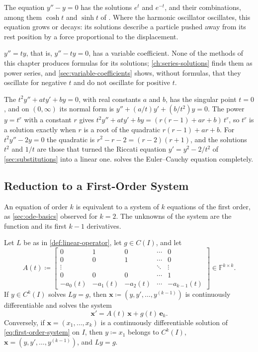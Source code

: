The equation $y''-y=0$ has the solutions $e^t$ and $e^{-t}$, and their combinations, among them $\cosh t$ and $\sinh t$ of . Where the harmonic oscillator oscillates, this equation grows or decays: its solutions describe a particle pushed away from its rest position by a force proportional to the displacement.

 $y''=ty$, that is, $y''-ty=0$, has a variable coefficient. None of the methods of this chapter produces formulas for its solutions; \cref{ch:series-solutions} finds them as power series, and \cref{sec:variable-coefficients} shows, without formulas, that they oscillate for negative $t$ and do not oscillate for positive $t$.

The  $t^2y''+aty'+by=0$, with real constants $a$ and $b$, has the singular point $t=0$, and on $(0,\infty)$ its normal form is $y''+(a/t)y'+(b/t^2)y=0$. The power $y=t^r$ with a constant $r$ gives $t^2y''+aty'+by=(r(r-1)+ar+b)\,t^r$, so $t^r$ is a solution exactly when $r$ is a root of the quadratic $r(r-1)+ar+b$. For $t^2y''-2y=0$ the quadratic is $r^2-r-2=(r-2)(r+1)$, and the solutions $t^2$ and $1/t$ are those that turned the Riccati equation $y'=y^2-2/t^2$ of \cref{sec:substitutions} into a linear one.  solves the Euler--Cauchy equation completely.

\subsection{Reduction to a First-Order System}

An equation of order $k$ is equivalent to a system of $k$ equations of the first order, as \cref{sec:ode-basics} observed for $k=2$. The unknowns of the system are the function and its first $k-1$ derivatives.

\begin{proposition}
\label{prop:companion-system}
Let $L$ be as in \cref{def:linear-operator}, let $g\in C(I)$, and let
\begin{equation}
A(t)\coloneqq\begin{bmatrix}0&1&0&\cdots&0\\0&0&1&\cdots&0\\\vdots&&&\ddots&\vdots\\0&0&0&\cdots&1\\-a_0(t)&-a_1(t)&-a_2(t)&\cdots&-a_{k-1}(t)\end{bmatrix}\in\mathbb F^{k\times k} .
\label{eq:companion-system}
\end{equation}
If $y\in C^k(I)$ solves $Ly=g$, then $\mathbf x\coloneqq(y,y',\ldots,y^{(k-1)})$ is continuously differentiable and solves the system
\begin{equation}
\mathbf x'=A(t)\,\mathbf x+g(t)\,\mathbf e_k .
\label{eq:first-order-system}
\end{equation}
Conversely, if $\mathbf x=(x_1,\ldots,x_k)$ is a continuously differentiable solution of \eqref{eq:first-order-system} on $I$, then $y\coloneqq x_1$ belongs to $C^k(I)$, $\mathbf x=(y,y',\ldots,y^{(k-1)})$, and $Ly=g$.
\end{proposition}

